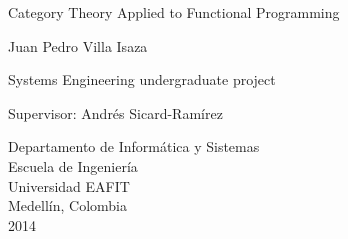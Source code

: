 \begin{titlepage}

  \begin{center}

    {\LARGE Category Theory Applied to Functional Programming}

    \vspace*{\fill}

    {\large Juan Pedro Villa Isaza}

    \vspace*{\fill}

    {\large Systems Engineering undergraduate project}

    \vspace*{\fill}

    {\large Supervisor:}
    {\large Andrés Sicard-Ramírez}

    \vspace*{\fill}

    {\large Departamento de Informática y Sistemas}\\
    {\large Escuela de Ingeniería}\\
    {\large Universidad EAFIT}\\
    {\large Medellín, Colombia}\\
    {\large 2014}

  \end{center}

\end{titlepage}

\clearemptydoublepage
